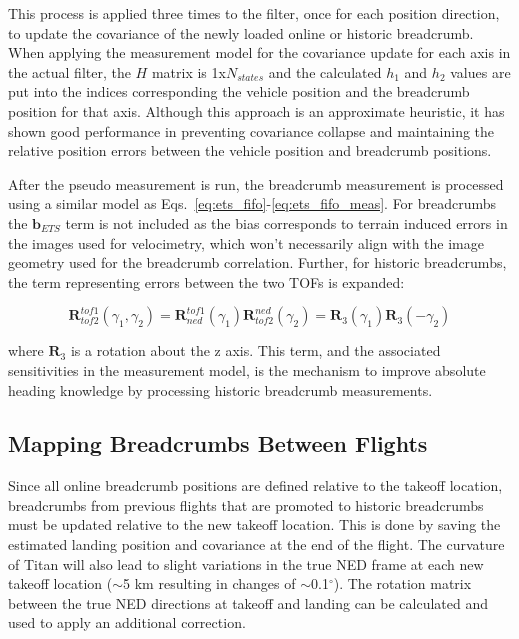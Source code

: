 \noindent This process is applied three times to the filter, once for each position direction, to update the covariance of the newly loaded online or historic breadcrumb.  When applying the measurement model for the covariance update for each axis in the actual filter, the $H$ matrix is 1x$N_{states}$ and the calculated $h_1$ and $h_2$ values are put into the indices corresponding the vehicle position and the breadcrumb position for that axis.  Although this approach is an approximate heuristic, it has shown good performance in preventing covariance collapse and maintaining the relative position errors between the vehicle position and breadcrumb positions.

After the pseudo measurement is run, the breadcrumb measurement is processed using a similar model as Eqs.~\ref{eq:ets_fifo}-\ref{eq:ets_fifo_meas}. For breadcrumbs the $\bm{b}_{ETS}$ term is not included as the bias corresponds to terrain induced errors in the images used for velocimetry, which won't necessarily align with the image geometry used for the breadcrumb correlation. Further, for historic breadcrumbs, the term representing errors between the two TOFs is expanded:

\begin{equation}
\bm{R}_{tof2}^{tof1}\left(\gamma_{1}, \gamma_{2}\right) = \bm{R}_{ned}^{tof1}\left(\gamma_{1}\right)\bm{R}_{tof2}^{ned}\left(\gamma_{2}\right) =  \bm{R}_{3}\left(\gamma_{1}\right)\bm{R}_{3}\left(-\gamma_{2}\right)
\end{equation}

\noindent where $\bm{R}_{3}$ is a rotation about the z axis. This term, and the associated sensitivities in the measurement model, is the mechanism to improve absolute heading knowledge by processing historic breadcrumb measurements.  

\subsection{Mapping Breadcrumbs Between Flights}

Since all online breadcrumb positions are defined relative to the takeoff location, breadcrumbs from previous flights that are promoted to historic breadcrumbs must be updated relative to the new takeoff location. This is done by saving the estimated landing position and covariance at the end of the flight. The curvature of Titan will also lead to slight variations in the true NED frame at each new takeoff location ($\sim$5 km resulting in changes of $\sim$0.1$^\circ$).  The rotation matrix between the true NED directions at takeoff and landing can be calculated and used to apply an additional correction.

